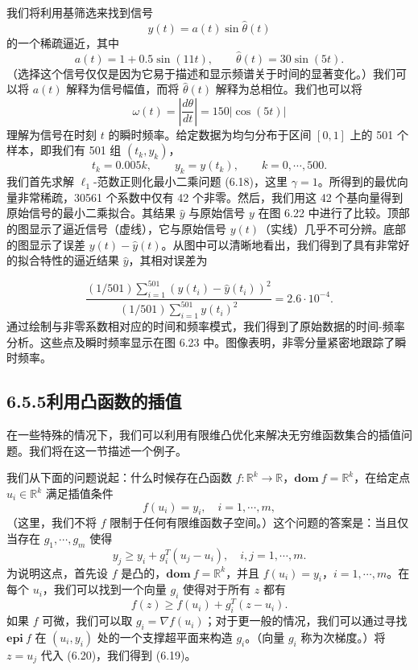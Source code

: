 \documentclass[UTF8,12pt,a4paper,fontset=fandol]{ctexart}
\begin{document}
我们将利用基筛选来找到信号
\[
y(t)=a(t)\sin\hat{\theta}(t)
\]
的一个稀疏逼近，其中
\[
a(t)=1+0.5\sin(11t),\qquad \hat{\theta}(t)=30\sin(5t).
\]
（选择这个信号仅仅是因为它易于描述和显示频谱关于时间的显著变化。）我们可以将 $a(t)$ 解释为信号幅值，而将 $\hat{\theta}(t)$ 解释为总相位。我们也可以将
\[
\omega(t)=\left|\frac{d\theta}{dt}\right|=150|\cos(5t)|
\]
理解为信号在时刻 $t$ 的瞬时频率。给定数据为均匀分布于区间 $[0,1]$ 上的 501 个样本，即我们有 501 组 $(t_k,y_k)$，
\[
t_k=0.005k,\qquad y_k=y(t_k),\qquad k=0,\cdots,500.
\]
我们首先求解 $\ell_1$-范数正则化最小二乘问题 (6.18)，这里 $\gamma=1$。所得到的最优向量非常稀疏，30561 个系数中仅有 42 个非零。然后，我们用这 42 个基向量得到原始信号的最小二乘拟合。其结果 $\hat{y}$ 与原始信号 $y$ 在图 6.22 中进行了比较。顶部的图显示了逼近信号（虚线），它与原始信号 $y(t)$（实线）几乎不可分辨。底部的图显示了误差 $y(t)-\hat{y}(t)$。从图中可以清晰地看出，我们得到了具有非常好的拟合特性的逼近结果 $\hat{y}$，其相对误差为

\[
\frac{(1/501)\sum_{i=1}^{501}(y(t_i)-\hat{y}(t_i))^2}{(1/501)\sum_{i=1}^{501}y(t_i)^2}=2.6\cdot 10^{-4}.
\]
通过绘制与非零系数相对应的时间和频率模式，我们得到了原始数据的时间-频率分析。这些点及瞬时频率显示在图 6.23 中。图像表明，非零分量紧密地跟踪了瞬时频率。

\subsection*{6.5.5\quad 利用凸函数的插值}

在一些特殊的情况下，我们可以利用有限维凸优化来解决无穷维函数集合的插值问题。我们将在这一节描述一个例子。

我们从下面的问题说起：什么时候存在凸函数 $f:\mathbb{R}^k\to\mathbb{R}$，$\mathbf{dom}\ f=\mathbb{R}^k$，在给定点 $u_i\in\mathbb{R}^k$ 满足插值条件
\[
f(u_i)=y_i,\quad i=1,\cdots,m,
\]
（这里，我们不将 $f$ 限制于任何有限维函数子空间。）这个问题的答案是：当且仅当存在 $g_1,\cdots,g_m$ 使得
\begin{equation}
y_j\geq y_i+g_i^T(u_j-u_i),\quad i,j=1,\cdots,m.
\tag{6.19}
\end{equation}
为说明这点，首先设 $f$ 是凸的，$\mathbf{dom}\ f=\mathbb{R}^k$，并且 $f(u_i)=y_i$，$i=1,\cdots,m$。在每个 $u_i$，我们可以找到一个向量 $g_i$ 使得对于所有 $z$ 都有
\begin{equation}
f(z)\geq f(u_i)+g_i^T(z-u_i).
\tag{6.20}
\end{equation}
如果 $f$ 可微，我们可以取 $g_i=\nabla f(u_i)$；对于更一般的情况，我们可以通过寻找 $\mathbf{epi}\ f$ 在 $(u_i,y_i)$ 处的一个支撑超平面来构造 $g_i$。（向量 $g_i$ 称为次梯度。）将 $z=u_j$ 代入 (6.20)，我们得到 (6.19)。
\end{document}

